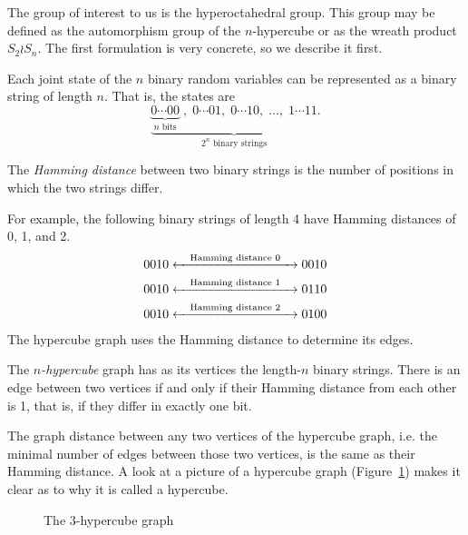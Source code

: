 \documentclass[cclicense]{hmcthesis}
\newcommand*{\x}[1]{\ensuremath{X^{(#1)}}}
\numberwithin{equation}{chapter}
\numberwithin{thmcounter}{chapter}
\begin{document}
    The group of interest to us is the hyperoctahedral group.  This group may be
    defined as the automorphism group of the $n$-hypercube or as the wreath
    product $S_2 \wr S_n$.
    The first formulation is very concrete, so we describe it first. 

    Each joint state of the $n$ binary random variables can be represented as a
    binary string of length $n$.  That is, the states are
    \[
        \underbrace{
        \underbrace{0\cdots00}_\text{$n$ bits}\;,\;
        0\cdots01,\;
        0\cdots10,\;
        \ldots,\;
        1\cdots11
        }_\text{$2^n$ binary strings}.
    \]
    \begin{definition}
    The \emph{Hamming distance} between two binary strings is the number of
    positions in which the two strings differ.  
    \end{definition}
    For example, the following binary strings of length 4 have Hamming distances
    of 0, 1, and 2.
    \begin{align*}
        0010 &\xleftrightarrow{\quad\text{Hamming distance $0$}\quad} 0010 \\
        0010 &\xleftrightarrow{\quad\text{Hamming distance $1$}\quad} 0110 \\
        0010 &\xleftrightarrow{\quad\text{Hamming distance $2$}\quad} 0100
    \end{align*}
    The hypercube graph uses the Hamming distance to determine its edges.
    \begin{definition}
        The \emph{$n$-hypercube} graph has as its vertices the length-$n$ binary
        strings.  There is an edge between two vertices if and only if
        their Hamming distance from each other is 1, that is, if they differ in
        exactly one bit.
    \end{definition}
    The graph distance between any two vertices of the hypercube graph, i.e. the
    minimal number of edges between those two vertices, is the same as their
    Hamming distance.  A look at a picture of a hypercube graph
    (Figure~\ref{fig:hypercube}) makes it clear as to why it is called a
    hypercube.


    \begin{figure}[h]
        \centering


        \caption{The $3$-hypercube graph}
        \label{fig:hypercube}
    \end{figure}
    
\end{document}
